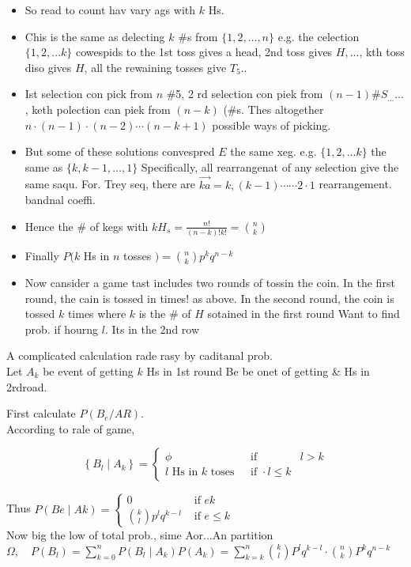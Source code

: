 \documentclass[10pt]{article}
\begin{document}
\begin{itemize}
  \item[-] So read to count hav vary ags with \(k\) Hs.
  \item[-] Chis is the same as delecting \(k\) \#s from \(\{1,2, \ldots, n\}\) e.g. the celection \(\{1,2, \ldots k\}\) cowespids to the 1st toss gives a head, 2nd toss gives \(H, \ldots\), kth toss diso gives \(H\), all the rewaining tosses give \(T_{5}\)..
  \item[-] Ist selection con pick from \(n\) \#5, 2 rd selection con piek from \((n-1) \# S_{\ldots} \ldots\), keth polection can piek from \((n-k)\) (\#s. Thes altogether \(n \cdot(n-1) \cdot(n-2) \cdots(n-k+1)\) possible ways of picking.
  \item[-] But some of these solutions convespred \(E\) the same xeg. e.g. \(\{1,2, \ldots k\}\) the same as \(\{k, k-1, \ldots, 1\}\) Specifically, all rearrangenat of any selection give the same saqu. For. Trey seq, there are \(\overrightarrow{k a}=k,(k-1) \cdots \cdots 2 \cdot 1\) rearrangement. bandnal coeffi.
  \item[-] Hence the \# of kegs with \(k H_{s}=\frac{n!}{(n-k)!k!}=\binom{n}{k}\)
  \item[-] Finally \(P(k\) Hs in \(n\) tosses \()=\binom{n}{k} p^{k} q^{n-k}\)
  \item[-] Now cansider a game tast includes two rounds of tossin the coin. In the first round, the cain is tossed in times! as above. In the second round, the coin is tossed \(k\) times where \(k\) is the \(\#\) of \(H\) sotained in the first round Want to find prob. if hourng \(l\). Its in the 2nd row
\end{itemize}

A complicated calculation rade rasy by caditanal prob.\\
Let \(A_{k}\) be event of getting \(k\) Hs in 1st round Be be onet of getting \& Hs in 2rdroad.

First calculate \(P\left(B_{e} / A R\right)\).\\
According to rale of game,

\[
\left\{B_{l} \mid A_{k}\right\}=\left\{\begin{array}{lll}
\phi & \text { if } & l>k \\
l \text { Hs in } k \text { toses } & \text { if } \cdot l \leq k
\end{array}\right.
\]

Thus \(P(B e \mid A k)= \begin{cases}0 & \text { if } e k \\ \binom{k}{l} p^{l} q^{k-l} & \text { if } e \leq k\end{cases}\)\\
Now big the low of total prob., sime Aor...An partition \(\Omega, \quad P\left(B_{l}\right)=\sum_{k=0}^{n} P\left(B_{l} \mid A_{k}\right) P\left(A_{k}\right)=\sum_{k=k}^{n}\binom{k}{l} P^{l} q^{k-l} \cdot\binom{n}{k} P^{k} q^{n-k}\)
\end{document}
